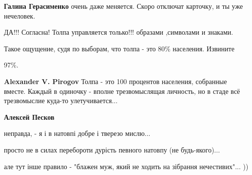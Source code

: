 \begin{itemize}
\begin{itemize}
\textbf{Галина Герасименко} очень даже меняется. Скоро отключат карточку, и ты уже нечеловек.
\end{itemize}

 
ДА!!! Согласна! Толпа управляется только!!! образами ,символами и знаками.

 
Такое ощущение, судя по выборам, что толпа - это 80\% населения. Извините

\begin{itemize}
 
97\%.

 
\textbf{Alexander V. Pirogov} Толпа - это 100 процентов населения, собранные
вместе. Каждый в одиночку - вполне трезвомыслящая личность, но в стаде всё
трезвомыслие куда-то улетучивается...

 
\textbf{Алексей Песков} 

неправда, - я і в натовпі добре і тверезо мислю...

просто не в силах перебороти дурість певного натовпу (не будь-якого)...

але тут інше правило - "блажен муж, який не ходить на зібрання нечестивих"...
))


\end{itemize}
\end{itemize}
